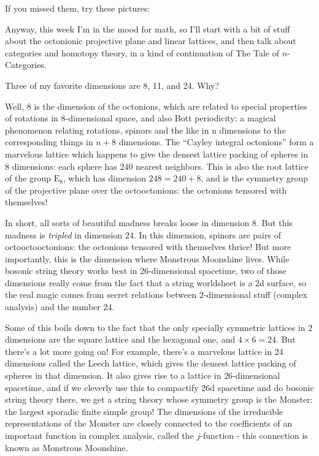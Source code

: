 \documentclass{article}
\def\tightlist{}
\renewcommand{\texttt}[1]{%
  \begingroup
  \ttfamily
  \begingroup\lccode`~=`/\lowercase{\endgroup\def~}{/\discretionary{}{}{}}%
  \begingroup\lccode`~=`[\lowercase{\endgroup\def~}{[\discretionary{}{}{}}%
  \begingroup\lccode`~=`.\lowercase{\endgroup\def~}{.\discretionary{}{}{}}%
  \catcode`/=\active\catcode`[=\active\catcode`.=\active
  \scantokens{#1\noexpand}%
  \endgroup
}
\begin{document}
If you missed them, try these pictures:


Anyway, this week I'm in the mood for math, so I'll start with a bit of
stuff about the octonionic projective plane and linear lattices, and
then talk about categories and homotopy theory, in a kind of
continuation of The Tale of \(n\)-Categories.

Three of my favorite dimensions are 8, 11, and 24. Why?

Well, 8 is the dimension of the octonions, which are related to special
properties of rotations in \(8\)-dimensional space, and also Bott
periodicity: a magical phenomenon relating rotations, spinors and the
like in n dimensions to the corresponding things in \(n+8\) dimensions.
The ``Cayley integral octonions'' form a marvelous lattice which happens
to give the densest lattice packing of spheres in 8 dimensions: each
sphere has 240 nearest neighbors. This is also the root lattice of the
group \(\mathrm{E}_8\), which has dimension \(248 = 240+8\), and is the
symmetry group of the projective plane over the octooctonions: the
octonions tensored with themselves!

In short, all sorts of beautiful madness breaks loose in dimension 8.
But this madness is \emph{tripled} in dimension 24. In this dimension,
spinors are pairs of octooctooctonions: the octonions tensored with
themselves thrice! But more importantly, this is the dimension where
Monstrous Moonshine lives. While bosonic string theory works best in
26-dimensional spacetime, two of those dimensions really come from the
fact that a string worldsheet is a 2d surface, so the real magic comes
from secret relations between \(2\)-dimensional stuff (complex analysis)
and the number 24.

Some of this boils down to the fact that the only specially symmetric
lattices in 2 dimensions are the square lattice and the hexagonal one,
and \(4 \times 6 = 24\). But there's a lot more going on! For example,
there's a marvelous lattice in 24 dimensions called the Leech lattice,
which gives the densest lattice packing of spheres in that dimension. It
also gives rise to a lattice in \(26\)-dimensional spacetime, and if we
cleverly use this to compactify 26d spacetime and do bosonic string
theory there, we get a string theory whose symmetry group is the
Monster: the largest sporadic finite simple group! The dimensions of the
irreducible representations of the Monster are closely connected to the
coefficients of an important function in complex analysis, called the
\(j\)-function - this connection is known as Monstrous Moonshine.
\end{document}
